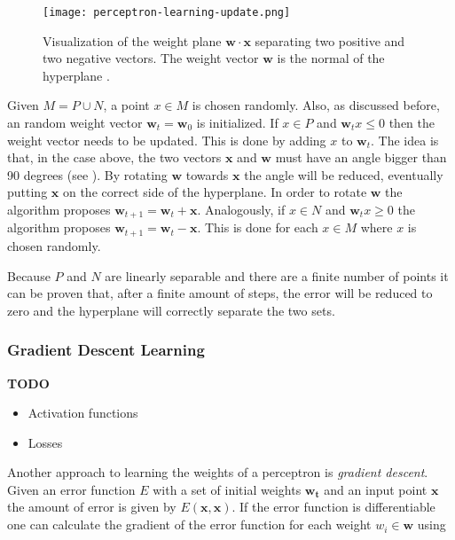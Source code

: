 \begin{figure}[htb!]
    \centering
    \texttt{[image: perceptron-learning-update.png]}
    \caption{Visualization of the weight plane $\bm{w} \cdot \bm{x}$ separating two positive and two negative vectors. The weight vector $\bm{w}$ is the normal of the hyperplane \cite{rojas_neural_1996}.}
    \label{fig:perceptron-learning-update}
\end{figure}

Given $M = P \cup N$, a point $x \in M$ is chosen randomly. 
Also, as discussed before, an random weight vector $\bm{w}_t = \bm{w}_0$ is initialized.
If $x \in P$ and $\bm{w}_t x \leq 0$ then the weight vector needs to be updated.
This is done by adding $x$ to $\bm{w}_t$.
The idea is that, in the case above, the two vectors $\bm{x}$ and $\bm{w}$ must have an angle bigger than 90 degrees (see ).
By rotating $\bm{w}$ towards $\bm{x}$ the angle will be reduced, eventually putting $\bm{x}$ on the correct side of the hyperplane.
In order to rotate $\bm{w}$ the algorithm proposes $\bm{w}_{t+1} = \bm{w}_{t} + \bm{x}$.
Analogously, if $x \in N$ and $\bm{w}_t x \geq 0$ the algorithm proposes $\bm{w}_{t+1} = \bm{w}_{t} - \bm{x}$.
This is done for each $x \in M$ where $x$ is chosen randomly.

Because $P$ and $N$ are linearly separable and there are a finite number of points it can be proven that, after a finite amount of steps, the error will be reduced to zero and the hyperplane will correctly separate the two sets.


\subsubsection{Gradient Descent Learning}
\textbf{TODO}
\begin{itemize}
    \item Activation functions
    \item Losses
\end{itemize}

Another approach to learning the weights of a perceptron is \textit{gradient descent}.
Given an error function $E$ with a set of initial weights $\bm{w_t}$ and an input point $\bm{x}$ the amount of error is given by $E(\bm{x}, \bm{x})$.
If the error function is differentiable one can calculate the gradient of the error function for each weight $w_i \in \bm{w}$ using 

